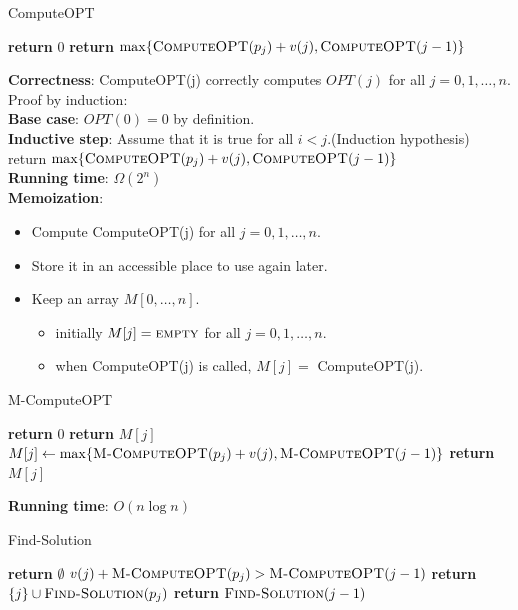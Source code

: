 \documentclass[onecolumn]{report}
\begin{document}
\begin{algorithm}[H]
\caption{ComputeOPT}
\begin{algorithmic}[1]
            \State \textbf{return} $0$
        \Else
            \State \textbf{return} $\max\{\textsc{ComputeOPT}(p_j)+v(j),\textsc{ComputeOPT}(j-1)\}$
        \EndIf
    \EndProcedure
\end{algorithmic}
\end{algorithm}
\noindent
\textbf{Correctness}:
ComputeOPT(j) correctly computes $OPT(j)$ for all $j=0,1,\dots,n$.\\
Proof by induction:\\
\textbf{Base case}: $OPT(0)=0$ by definition.\\
\textbf{Inductive step}: Assume that it is true for all $i<j$.(Induction hypothesis)\\
return $\max\{\textsc{ComputeOPT}(p_j)+v(j),\textsc{ComputeOPT}(j-1)\}$\\
\noindent
\textbf{Running time}: $\Omega(2^n)$\\
\textbf{Memoization}:
\begin{itemize}
    \item Compute ComputeOPT(j) for all $j=0,1,\dots,n$.
    \item Store it in an accessible place to use again later.
    \item Keep an array $M[0,\dots,n]$.
    \begin{itemize}
        \item initially $M[j]=\textsc{empty}$ for all $j=0,1,\dots,n$.
        \item when ComputeOPT(j) is called, $M[j]=$ ComputeOPT(j).
    \end{itemize}
\end{itemize}
\begin{algorithm}[H]
\caption{M-ComputeOPT}
\begin{algorithmic}
            \State \textbf{return} $0$
            \State \textbf{return} $M[j]$
        \Else
            \State $M[j] \gets \max\{\textsc{M-ComputeOPT}(p_j)+v(j),\textsc{M-ComputeOPT}(j-1)\}$
            \State \textbf{return} $M[j]$
        \EndIf
    \EndProcedure
\end{algorithmic}
\end{algorithm}
\noindent
\textbf{Running time}: $O(n \log n)$\\
\begin{algorithm}[H]
\caption{Find-Solution}
\begin{algorithmic}
            \State \textbf{return} $\emptyset$
        \Else 
            \If $v(j)+\textsc{M-ComputeOPT}(p_j)>\textsc{M-ComputeOPT}(j-1)$
                \State \textbf{return} $\{j\} \cup \textsc{Find-Solution}(p_j)$
            \Else
                \State \textbf{return} $\textsc{Find-Solution}(j-1)$
            \EndIf
        \EndIf
    \EndProcedure
\end{algorithmic}
\end{algorithm}
\end{document}
